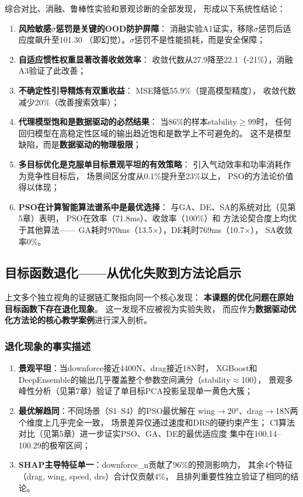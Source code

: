综合对比、消融、鲁棒性实验和景观诊断的全部发现，
形成以下系统性结论：

\begin{enumerate}
    \item \textbf{风险敏感$\sigma$惩罚是关键的OOD防护屏障}：
        消融实验A1证实，移除$\sigma$惩罚后适应度飙升至101.30
        （即幻觉）。$\sigma$惩罚不是性能损耗，而是安全保障；
    \item \textbf{自适应惯性权重显著改善收敛效率}：
        收敛代数从27.9降至22.1（-21\%），消融A3验证了此改善；
    \item \textbf{不确定性引导精炼有双重收益}：
        MSE降低55.9\%（提高模型精度），
        收敛代数减少20\%（改善搜索效率）；
    \item \textbf{代理模型饱和是数据驱动的必然结果}：
        当86\%的样本stability$\geq 99$时，
        任何回归模型在高稳定性区域的输出趋近饱和是数学上不可避免的。
        这不是模型缺陷，而是\textbf{数据驱动的物理极限}；
    \item \textbf{多目标优化是克服单目标景观平坦的有效策略}：
        引入气动效率和功率消耗作为竞争性目标后，
        场景间区分度从0.1\%提升至23\%以上，
        PSO的方法论价值得以体现；
    \item \textbf{PSO在计算智能算法谱系中是最优选择}：
        与GA、DE、SA的系统对比（见第5章）表明，
        PSO在效率（71.8ms）、收敛率（100\%）和
        方法论契合度上均优于其他算法——
        GA耗时970ms（13.5$\times$），DE耗时769ms（10.7$\times$），
        SA收敛率0\%。
\end{enumerate}

\subsection{目标函数退化——从优化失败到方法论启示}

上文多个独立视角的证据链汇聚指向同一个核心发现：
\textbf{本课题的优化问题在原始目标函数下存在退化现象}。
这一发现不应被视为实验失败，
而应作为\textbf{数据驱动优化方法论的核心教学案例}进行深入剖析。

\subsubsection{退化现象的事实描述}

\begin{enumerate}
    \item \textbf{景观平坦}：当downforce接近4400N、drag接近18N时，
        XGBoost和DeepEnsemble的输出几乎覆盖整个参数空间满分（stability$\approx$100），
        景观多峰性分析（见第7章）验证了单目标PCA投影呈现单一黄色大簇；

    \item \textbf{最优解趋同}：不同场景（S1--S4）的PSO最优解在
        wing$\to$20°、drag$\to$18N两个维度上几乎完全一致，
        场景差异仅通过速度和DRS的硬约束产生；
        CI算法对比（见第5章）进一步证实PSO、GA、DE的最优适应度
        集中在100.14--100.29的极窄区间；

    \item \textbf{SHAP主导特征单一}：downforce\_n贡献了96\%的预测影响力，
        其余4个特征（drag, wing, speed, drs）合计仅贡献4\%，
        且排列重要性独立验证了相同的结论。
\end{enumerate}

